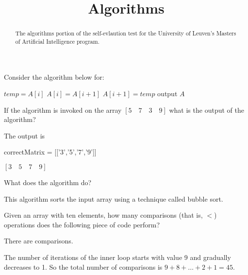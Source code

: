 \documentclass{ximera}
\title{Algorithms}
\begin{document}
\begin{abstract}
The algorithms portion of the self-evlaution test for the University
of Leuven's Masters of Artificial Intelligence program.
\end{abstract}
\maketitle

\begin{question}
Consider the algorithm below for: 
\begin{algorithm}%
\begin{algorithmic}
  \STATE $temp = A[i]$
  \STATE $A[i] = A[i+1]$
  \STATE $A[i+1] = temp$
  \ENDIF
  \ENDFOR
  \ENDFOR
  \STATE output $A$
\end{algorithmic}
\end{algorithm}

If the algorithm is invoked on the array $[ 5\quad 7\quad 3\quad 9]$ what is the output of the algorithm?
\begin{solution}
The output is 
\begin{matrix-answer}[name=M]
    correctMatrix = [['3','5','7','9']]
\end{matrix-answer}
$ [3 \quad 5 \quad 7 \quad 9] $
\end{solution}

What does the algorithm do? 
\begin{free-response}
\end{free-response}
This algorithm sorts the input array using a technique called bubble sort.

Given an array with ten elements, how many comparisons (that is, $<$)
operations does the following piece of code perform?
\begin{solution}
There are  comparisons.
\end{solution}  
The number of iterations of the inner loop starts with value 9 and
gradually decreases to 1. So the total number of comparisons is $ 9 +
8 + \ldots + 2 + 1 = 45$.


\end{question}
\end{document}
